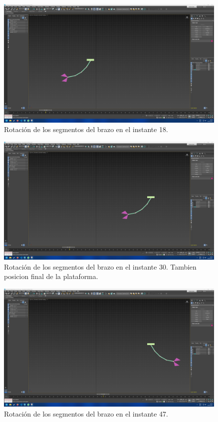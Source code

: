 \documentclass{article}
\begin{document}
\begin{figure}[H]
    \centering
    \includegraphics[width=\textwidth]{imagenes/Ejercicio4/keyframes/18.png}
    \caption{Rotación de los segmentos del brazo en el instante 18.}
\end{figure}

\begin{figure}[H]
    \centering
    \includegraphics[width=\textwidth]{imagenes/Ejercicio4/keyframes/30.png}
    \caption{Rotación de los segmentos del brazo en el instante 30. Tambien posicion final de la plataforma.}
\end{figure}

\begin{figure}[H]
    \centering
    \includegraphics[width=\textwidth]{imagenes/Ejercicio4/keyframes/47.png}
    \caption{Rotación de los segmentos del brazo en el instante 47.}
\end{figure}
\end{document}
